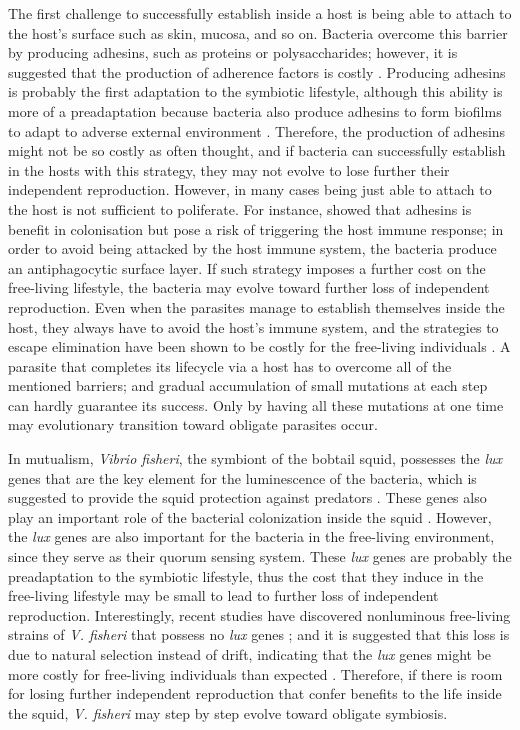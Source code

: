 \documentclass[11.5pt]{article}
\begin{document}
The first challenge to successfully establish inside a host is being able to attach to the host's surface such as skin, mucosa, and so on. Bacteria overcome this barrier by producing adhesins, such as proteins or polysaccharides; however, it is suggested that the production of adherence factors is costly \parencite{Jefferson2004}. Producing adhesins is probably the first adaptation to the symbiotic lifestyle, although this ability is more of a preadaptation because bacteria also produce adhesins to form biofilms to adapt to adverse external environment \parencite{Jefferson2004}. Therefore, the production of adhesins might not be so costly as often thought, and if bacteria can successfully establish in the hosts with this strategy, they may not evolve to lose further their independent reproduction. However, in many cases being just able to attach to the host is not sufficient to poliferate. For instance, \textcite{Kline2009} showed that adhesins is benefit in colonisation but pose a risk of triggering the host immune response; in order to avoid being attacked by the host immune system, the bacteria produce an antiphagocytic surface layer. If such strategy imposes a further cost on the free-living lifestyle, the bacteria may evolve toward further loss of independent reproduction. Even when the parasites manage to establish themselves inside the host, they always have to avoid the host's immune system, and the strategies to escape elimination have been shown to be costly for the free-living individuals \parencite{Sturm2011}. A parasite that completes its lifecycle via a host has to overcome all of the mentioned barriers; and gradual accumulation of small mutations at each step can hardly guarantee its success. Only by having all these mutations at one time may evolutionary transition toward obligate parasites occur.

\medskip

In mutualism,  \textit{Vibrio fisheri}, the symbiont of the bobtail squid, possesses the \textit{lux} genes that are the key element for the luminescence of the bacteria, which is suggested to provide the squid protection against predators \parencite{Miyashiro2012}. These genes also play an important role of the bacterial colonization inside the squid \parencite{Visick2000}. However, the \textit{lux} genes are also important for the bacteria in the free-living environment, since they serve as their quorum sensing system. These \textit{lux} genes are probably the preadaptation to the symbiotic lifestyle, thus the cost that they induce in the free-living lifestyle may be small to lead to further loss of independent reproduction. Interestingly, recent studies have discovered nonluminous free-living strains of \textit{V. fisheri} that possess no \textit{lux} genes \parencite{Wollenberg2012}; and it is suggested that this loss is due to natural selection instead of drift, indicating that the \textit{lux} genes might be more costly for free-living individuals than expected \parencite{Miyashiro2012}. Therefore, if there is room for losing further independent reproduction that confer benefits to the life inside the squid, \textit{V. fisheri} may step by step evolve toward obligate symbiosis.

\printbibliography
\end{document}
